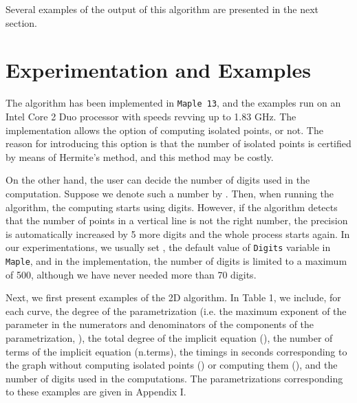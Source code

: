 \documentclass{elsart}
\begin{document}
 Several examples of the output of this algorithm are presented in the next section.



\section{Experimentation and Examples} \label{Examp}

The algorithm has been implemented in \texttt{Maple 13}, and the examples
run on an Intel Core 2 Duo processor with speeds revving up to
1.83 GHz. The implementation allows the option of computing
isolated points, or not. The reason for introducing this option is
that the number of isolated points is certified by means of
Hermite's method, and this method may be costly.

On the other hand, the user can decide the number of digits used
in the computation. Suppose we denote such a number by . Then,
when running the algorithm, the computing starts using  digits.
However, if the algorithm detects that the number of points in a
vertical line is not the right number, the precision is
automatically increased by 5 more digits and the whole process
starts again. In our experimentations, we usually set , the
default value of \texttt{Digits} variable in \texttt{Maple}, and
in the implementation, the number of digits is limited to a
maximum of 500, although we have never needed more than 70 digits.





Next, we first present examples of the 2D algorithm. In Table 1, we include, for each curve, the degree of the
parametrization (i.e. the maximum exponent of the parameter in the
numerators and denominators of the components of the
parametrization, ), the total degree of the implicit equation
(), the number of terms of the implicit equation (n.terms),
 the
timings in seconds corresponding to the graph without computing isolated
points () or computing them (), and the number of digits
used in the computations. The parametrizations corresponding to
these examples are given in Appendix I.
\end{document}
